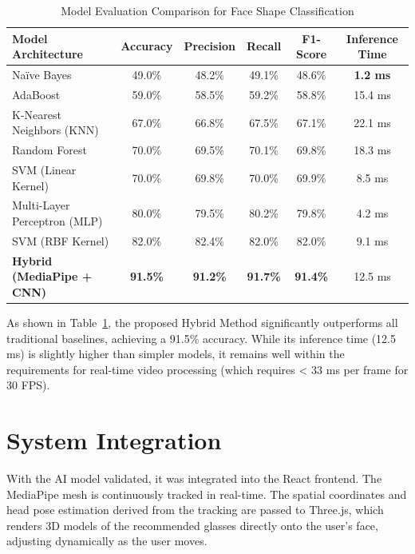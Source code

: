 \begin{table}[H]
    \centering
    \caption{Model Evaluation Comparison for Face Shape Classification}
    \label{tab:model_comparison}
    \renewcommand{\arraystretch}{1.5}
    \begin{tabular}{|l|c|c|c|c|c|}
        \hline
        \rowcolor{chapterblue!20}
        \textbf{Model Architecture} & \textbf{Accuracy} & \textbf{Precision} & \textbf{Recall} & \textbf{F1-Score} & \textbf{Inference Time} \\ \hline
        Naïve Bayes & 49.0\% & 48.2\% & 49.1\% & 48.6\% & \textbf{1.2 ms} \\ \hline
        AdaBoost & 59.0\% & 58.5\% & 59.2\% & 58.8\% & 15.4 ms \\ \hline
        K-Nearest Neighbors (KNN) & 67.0\% & 66.8\% & 67.5\% & 67.1\% & 22.1 ms \\ \hline
        Random Forest & 70.0\% & 69.5\% & 70.1\% & 69.8\% & 18.3 ms \\ \hline
        SVM (Linear Kernel) & 70.0\% & 69.8\% & 70.0\% & 69.9\% & 8.5 ms \\ \hline
        Multi-Layer Perceptron (MLP) & 80.0\% & 79.5\% & 80.2\% & 79.8\% & 4.2 ms \\ \hline
        SVM (RBF Kernel) & 82.0\% & 82.4\% & 82.0\% & 82.0\% & 9.1 ms \\ \hline
        \rowcolor{green!10}
        \textbf{Hybrid (MediaPipe + CNN)} & \textbf{91.5\%} & \textbf{91.2\%} & \textbf{91.7\%} & \textbf{91.4\%} & 12.5 ms \\ \hline
    \end{tabular}
\end{table}

As shown in Table~\ref{tab:model_comparison}, the proposed Hybrid Method significantly outperforms all traditional baselines, achieving a 91.5\% accuracy. While its inference time (12.5 ms) is slightly higher than simpler models, it remains well within the requirements for real-time video processing (which requires < 33 ms per frame for 30 FPS).

\section{System Integration}
\label{sec:meth_integration}

With the AI model validated, it was integrated into the React frontend. The MediaPipe mesh is continuously tracked in real-time. The spatial coordinates and head pose estimation derived from the tracking are passed to Three.js, which renders 3D models of the recommended glasses directly onto the user's face, adjusting dynamically as the user moves.

